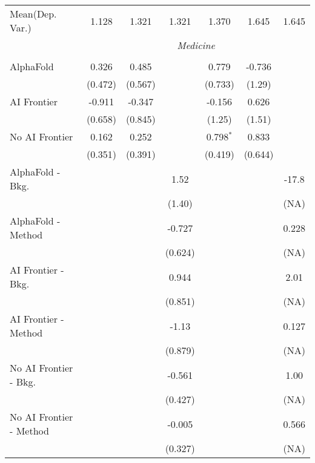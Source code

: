 \begin{tabular}{lcccccc}
Mean(Dep. Var.) & 1.128 & 1.321 & 1.321 & 1.370 & 1.645 & 1.645 \\
 & \multicolumn{6}{c}{\textit{Medicine}} \\ \\
   AlphaFold               & 0.326   & 0.485   &         & 0.779       & -0.736  &   \\   
                           & (0.472) & (0.567) &         & (0.733)     & (1.29)  &   \\   
   AI Frontier             & -0.911  & -0.347  &         & -0.156      & 0.626   &   \\   
                           & (0.658) & (0.845) &         & (1.25)      & (1.51)  &   \\   
   No AI Frontier          & 0.162   & 0.252   &         & 0.798$^{*}$ & 0.833   &   \\   
                           & (0.351) & (0.391) &         & (0.419)     & (0.644) &   \\   
   AlphaFold - Bkg.        &         &         & 1.52    &             &         & -17.8\\   
                           &         &         & (1.40)  &             &         & (NA)\\   
   AlphaFold - Method      &         &         & -0.727  &             &         & 0.228\\   
                           &         &         & (0.624) &             &         & (NA)\\   
   AI Frontier - Bkg.      &         &         & 0.944   &             &         & 2.01\\   
                           &         &         & (0.851) &             &         & (NA)\\   
   AI Frontier - Method    &         &         & -1.13   &             &         & 0.127\\   
                           &         &         & (0.879) &             &         & (NA)\\   
   No AI Frontier - Bkg.   &         &         & -0.561  &             &         & 1.00\\   
                           &         &         & (0.427) &             &         & (NA)\\   
   No AI Frontier - Method &         &         & -0.005  &             &         & 0.566\\   
                           &         &         & (0.327) &             &         & (NA)\\   

\end{tabular}
